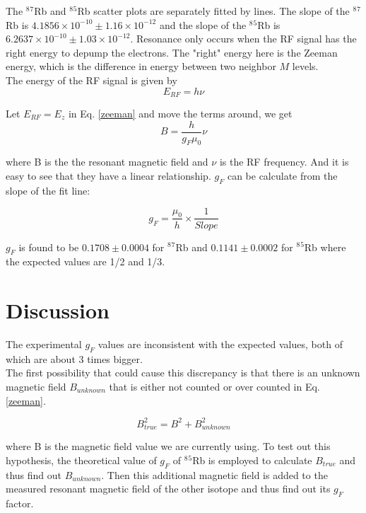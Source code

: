 \documentclass[prb,preprint]{revtex4-1}
\begin{document}
The $^8$$^7$Rb and $^8$$^5$Rb scatter plots are separately fitted by lines. The slope of the $^8$$^7$Rb is $4.1856\times 10^{-10} \pm 1.16 \times 10^{-12}$ and the slope of the $^8$$^5$Rb is $6.2637 \times 10^{-10} \pm 1.03 \times 10^{-12}$. Resonance only occurs when the RF signal has the right energy to depump the electrons. The "right" energy here is the Zeeman energy, which is the difference in energy between two neighbor $M$ levels. \\

The energy of the RF signal is given by
\begin{equation}
E_{RF}=h\nu
\label{rfenergy}
\end{equation}

Let $E_{RF}=E_{z}$ in Eq. \ref{zeeman} and move the terms around, we get
\begin{equation}
B=\frac{h}{g_{F}\mu_{0}}\nu
\label{bandf}
\end{equation}

where B is the the resonant magnetic field and $\nu$ is the RF frequency. And it is easy to see that they have a linear relationship. $g_{F}$ can be calculate from the slope of the fit line:

\begin{equation}
g_{F}=\frac{\mu_{0}}{h} \times \frac{1}{Slope}
\label{gf}
\end{equation}

$g_{F}$ is found to be $0.1708\pm0.0004$ for $^8$$^7$Rb and $0.1141\pm0.0002$ for $^8$$^5$Rb where the expected values are 1/2 and 1/3.



\section{Discussion}
The experimental $g_{F}$ values are inconsistent with the expected values, both of which are about 3 times bigger.\\
The first possibility that could cause this discrepancy is that there is an unknown magnetic field $B_{unknown}$ that is either not counted or over counted in Eq. \ref{zeeman}. 

\begin{equation}
B_{true}^{2}=B^{2}+B_{unknown}^{2}
\label{bnew}
\end{equation}

where B is the magnetic field value we are currently using. To test out this hypothesis, the theoretical value of $g_{F}$ of $^8$$^5$Rb is employed to calculate $B_{true}$ and thus find out $B_{unknown}$. Then this additional magnetic field is added to the measured resonant magnetic field of the other isotope and thus find out its $g_{F}$ factor. \\
\end{document}
